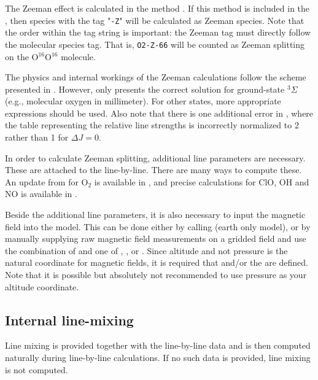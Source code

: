 The Zeeman effect is calculated in the method .
If this method is included in the , then species with the
tag "\verb|-Z|" will be calculated as Zeeman species.
Note that the order within the tag
string is important: the Zeeman tag must directly follow the molecular species
tag. That is, \verb|O2-Z-66| will be counted as Zeeman splitting on the
O$^{16}$O$^{16}$ molecule.

The physics and internal workings of the Zeeman calculations follow the scheme
presented in \citet{larsson14:_treatment_jqsrt}.  However, \citet{larsson14:_treatment_jqsrt}
only presents the correct solution for ground-state $^3\Sigma$ (e.g., molecular oxygen in millimeter).  
For other states, more appropriate expressions should be used.  Also note that there is one
additional error in \citet{larsson14:_treatment_jqsrt}, where the table representing the relative line strengths is
incorrectly normalized to 2 rather than 1 for $\Delta J = 0$.

In order to calculate Zeeman splitting, additional line parameters are necessary. These are attached to the
line-by-line.  There are many ways to compute these.  An update from \citet{larsson14:_treatment_jqsrt}
for O$_2$ is available in \citet{larsson19:_updated_jqsrt}, and precise calculations for {ClO}, {OH} and {NO} is
available in \citet{larsson20:_zeeman_jqsrt}.

Beside the additional line parameters, it is also necessary to input the magnetic
field into the model. This can be done either by calling  (earth only model),
or by manually supplying raw magnetic field measurements on a gridded field and use
the combination of  and one of , ,
or .  Since altitude and not pressure is the natural coordinate for magnetic fields,
it is required that  and/or the  are defined.  Note that it is possible but absolutely
not recommended to use pressure as your altitude coordinate.

\subsection{Internal line-mixing}
\label{sec:absorption:line-mixing}

Line mixing is provided together with the line-by-line data and is then computed naturally during line-by-line
calculations.  If no such data is provided, line mixing is not computed.

